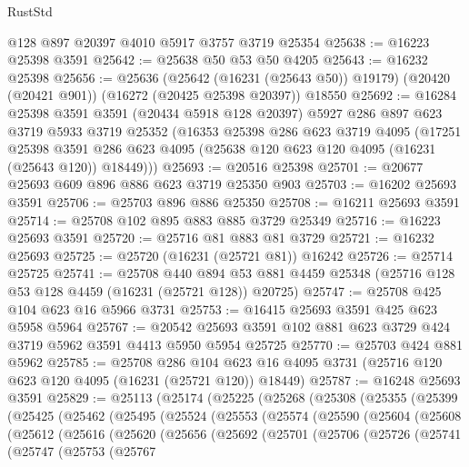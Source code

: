 \begin{lexlean}{RustStd}
\begin{coremodule}
    @128
    @897
    @20397
    @4010
    @5917
    @3757
    @3719
    @25354
@25638 := @16223 @25398 @3591
@25642 := @25638 @50 @53 @50 @4205
@25643 := @16232 @25398
@25656 := @25636
    (@25642 (@16231 (@25643 @50)) @19179)
    (@20420 (@20421 @901))
    (@16272 (@20425 @25398 @20397))
    @18550
@25692 := @16284
    @25398
    @3591
    @3591
    (@20434 @5918 @128 @20397)
    @5927
    @286
    @897
    @623
    @3719
    @5933
    @3719
    @25352
    (@16353
      @25398
      @286
      @623
      @3719
      @4095
      (@17251
        @25398
        @3591
        @286
        @623
        @4095
        (@25638 @120 @623 @120 @4095 (@16231 (@25643 @120)) @18449)))
@25693 := @20516 @25398
@25701 := @20677 @25693 @609 @896 @886 @623 @3719 @25350 @903
@25703 := @16202 @25693 @3591
@25706 := @25703 @896 @886 @25350
@25708 := @16211 @25693 @3591
@25714 := @25708 @102 @895 @883 @885 @3729 @25349
@25716 := @16223 @25693 @3591
@25720 := @25716 @81 @883 @81 @3729
@25721 := @16232 @25693
@25725 := @25720 (@16231 (@25721 @81)) @16242
@25726 := @25714 @25725
@25741 := @25708
    @440
    @894
    @53
    @881
    @4459
    @25348
    (@25716 @128 @53 @128 @4459 (@16231 (@25721 @128)) @20725)
@25747 := @25708 @425 @104 @623 @16 @5966 @3731
@25753 := @16415 @25693 @3591 @425 @623 @5958 @5964
@25767 := @20542 @25693 @3591 @102 @881 @623 @3729 @424 @3719 @5962 @3591 @4413 @5950 @5954 @25725
@25770 := @25703 @424 @881 @5962
@25785 := @25708
    @286
    @104
    @623
    @16
    @4095
    @3731
    (@25716 @120 @623 @120 @4095 (@16231 (@25721 @120)) @18449)
@25787 := @16248 @25693 @3591
@25829 := @25113
    (@25174
      (@25225
        (@25268
          (@25308
            (@25355
              (@25399
                (@25425
                  (@25462
                    (@25495
                      (@25524
                        (@25553
                          (@25574
                            (@25590
                              (@25604
                                (@25608
                                  (@25612
                                    (@25616
                                      (@25620
                                        (@25656
                                          (@25692
                                            (@25701
                                              (@25706
                                                (@25726
                                                  (@25741
                                                    (@25747
                                                      (@25753
                                                        (@25767

\end{coremodule}
\end{lexlean}
